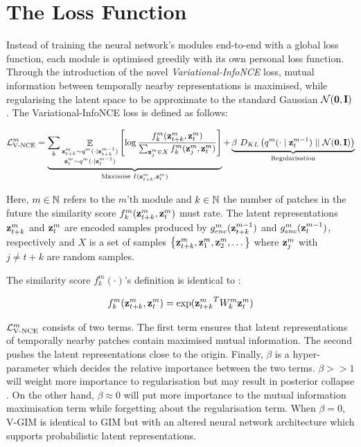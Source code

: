 	
		
\section{The Loss Function} \label{cha:vgim_learning_objective}
	Instead of training the neural network's modules end-to-end with a global loss function, each module is optimised greedily with its own personal loss function. Through the introduction of the novel \textit{Variational-InfoNCE} loss, mutual information between temporally nearby representations is maximised, while regularising the latent space to be approximate to the standard Gaussian $\mathcal{N}(\bm{\mathbf{0}}, \mathbf{I})$. The Variational-InfoNCE loss is defined as follows:
	
	\begin{equation} %
		\Lvnce^m =
		\underbrace{\reconstrgim}_{\text{Maximise } I(\ztk^m, \zt^m)} + \underbrace{\beta ~ \latentspaceconstraintgim}_{\text{Regularisation}}
		\label{eq:variational_gim_loss}
	\end{equation}

	Here, $m \in \mathbb{N}$ refers to the $m$'th module and $k \in \mathbb{N}$ the number of patches in the future the similarity score $f_k^m({\mathbf{z}_{t+k}^m},{\mathbf{z}_t^m})$ must rate. The latent representations $\mathbf{z}_{t+k}^m$ and $\mathbf{z}_t^m$ are encoded samples produced by $g_{enc}^m(\mathbf{z}_{t+k}^{m-1})$ and $g_{enc}^m(\mathbf{z}_t^{m-1})$, respectively and $X$ is a set of samples ${ \left\{ \mathbf{z}_{t+k}^m, \mathbf{z}_1^m, \mathbf{z}_2^m, \dots \right\} }$ where $\mathbf{z}_j^m$ with $j \neq t \! + \! k$ are random samples.


	The similarity score $f_k^m(\cdot)$'s definition is identical to \citep{lowePuttingEndEndtoEnd2020a}:
	
	$$ f_k^m(\mathbf{z}_{t+k}^m,\mathbf{z}_t^m) = \exp({\mathbf{z}_{t+k}^m}^TW_k^m\mathbf{z}_t^m) $$
	
	
	$\mathcal{L}_{\text{V-NCE}}^m$ consists of two terms. The first term ensures that latent representations of temporally nearby patches contain maximised mutual information. The second pushes the latent representations close to the origin. Finally, $\beta$ is a hyper-parameter which decides the relative importance between the two terms. $\beta >> 1$ will weight more importance to regularisation but may result in posterior collapse \citep{lucasUnderstandingPosteriorCollapse2022}. On the other hand, $\beta \approx 0$ will put more importance to the mutual information maximisation term while forgetting about the regularisation term. When $\beta = 0$, V-GIM is identical to GIM but with an altered neural network architecture which supports probabilistic latent representations.
	
